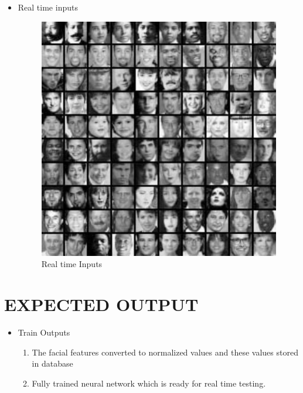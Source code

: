 \documentclass[10pt,a4paper,twoside]{report}
\begin{document}
\begin{itemize}
\item Real time inputs
\begin{center}
\begin{figure}[htpb]
\center \includegraphics[scale=.5]{real}
\caption{Real time Inputs}
\end{figure}


\end{center}
\end{itemize}

\chapter{EXPECTED OUTPUT}
\begin{itemize}
\item Train Outputs
\begin{enumerate}
\item	The facial features converted to normalized values and these values stored in database
\item Fully trained neural network which is ready for real time testing.

\end{enumerate}
\end{itemize}
\end{document}
